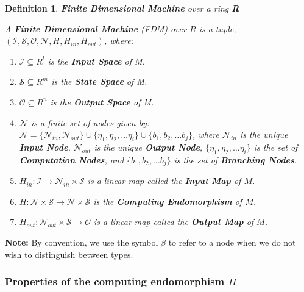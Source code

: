 \documentclass[twoside]{article}
\newcommand{\set}[1]{\{#1\}}
\newcommand{\functype}[3]{$#1:#2 \rightarrow #3$}
\newcommand{\inspace}[0]{\mathcal{I}}
\newcommand{\outspace}[0]{\mathcal{O}}
\newcommand{\statespace}[0]{\mathcal{S}}
\newcommand{\nodes}[0]{\mathcal{N}}
\newcommand{\nodein}[0]{\nodes_{in}}
\newcommand{\nodeout}[0]{\nodes_{out}}
\newcommand{\note}[1]{{\textbf{Note:} #1}}
\newtheorem{definition}{Definition}[section]
\begin{document}
\begin{definition}{\textbf{Finite Dimensional Machine} over a ring \textbf{R}}
  
  A \textbf{Finite Dimensional Machine} (FDM) over $R$ is a tuple,
  $(\inspace, \statespace, \outspace, \nodes, H, H_{in}, H_{out})$, where:
  
  \begin{enumerate}

  \item $\inspace \subseteq R^l$ is the \textbf{Input Space} of M.

  \item $\statespace \subseteq R^m$ is the \textbf{State Space} of M.

  \item $\outspace \subseteq R^n$ is the \textbf{Output Space} of M.

  \item $\nodes$ is a finite set of nodes given by: $ \nodes =
    \set{\nodein, \nodeout} \cup \set{\eta_1, \eta_2, \ldots \eta_i}
    \cup \set{b_1, b_2, \ldots b_j}$, where $\nodes_{in}$ is the
    unique \textbf{Input Node}, $\nodeout$ is the unique
    \textbf{Output Node}, $\set{\eta_1, \eta_2, \ldots \eta_i}$ is the
    set of \textbf{Computation Nodes}, and $ \set{b_1, b_2, \ldots b_j}$
    is the set of \textbf{Branching Nodes}.

  \item \functype{H_{in}}{\inspace}{\nodein \times \statespace} is a
    linear map called the \textbf{Input Map} of $M$.

  \item \functype{H}{\nodes \times \statespace}{\nodes \times
      \statespace} is the \textbf{Computing Endomorphism} of $M$.
    
  \item \functype{H_{out}}{\nodeout \times \statespace}{\outspace} is
    a linear map called the \textbf{Output Map} of $M$.
    
  \end{enumerate}
  
\end{definition}

\note{By convention, we use the symbol $\beta$ to refer to a node when
  we do not wish to distinguish between types.}

\subsubsection{Properties of the computing endomorphism $H$}
\end{document}

